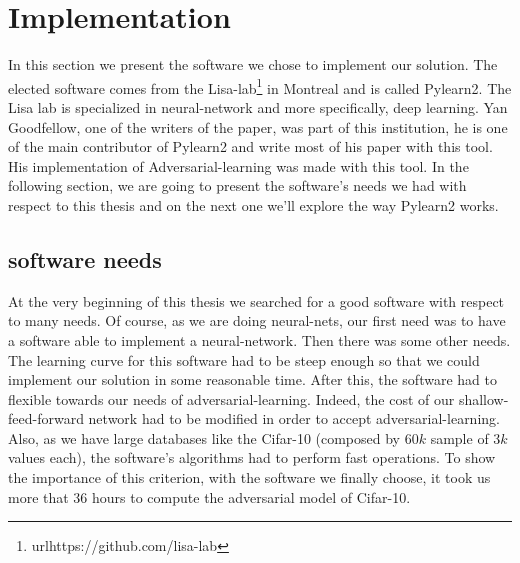
\section{Implementation}

	In this section we present the software we chose to implement our solution. The elected software comes from the Lisa-lab\footnote{url{https://github.com/lisa-lab}} in Montreal and is called Pylearn2. The Lisa lab is specialized in neural-network and more specifically, deep learning. Yan Goodfellow, one of the writers of the paper\cite{goodfellow2014explaining}, was part of this institution, he is one of the main contributor of Pylearn2 and write most of his paper with this tool. His implementation of Adversarial-learning was made with this tool. In the following section, we are going to present the software's needs we had with respect to this thesis and on the next one we'll explore the way Pylearn2 works.

	\subsection{software needs}
		At the very beginning of this thesis we searched for a good software with respect to many needs.
		Of course, as we are doing neural-nets, our first need was to have a software able to implement a neural-network. Then there was some other needs. The learning curve for this software had to be steep enough so that we could implement our solution in some reasonable time. After this, the software had to flexible towards our needs of adversarial-learning. Indeed, the cost of our shallow-feed-forward network had to be modified in order to accept adversarial-learning. Also, as we have large databases like the Cifar-10 (composed by $60k$ sample of $3k$ values each), the software's algorithms had to perform fast operations. To show the importance of this criterion, with the software we finally choose, it took us more that 36 hours to compute the adversarial model of Cifar-10.

